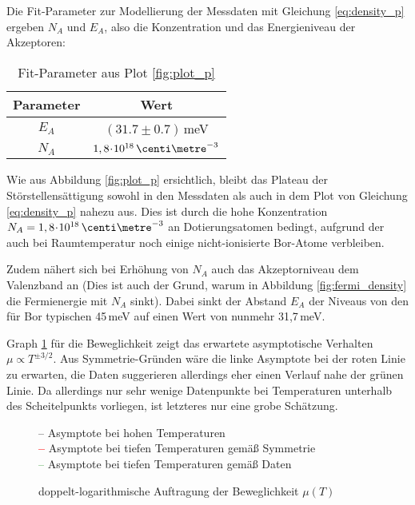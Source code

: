 Die Fit-Parameter zur Modellierung der Messdaten mit Gleichung \eqref{eq:density_p} ergeben $N_A$ und $E_A$, also die Konzentration und das Energieniveau der Akzeptoren:
\begin{table}[h!]
\centering
\caption{Fit-Parameter aus Plot \ref{fig:plot_p}} \label{tab:p_fit}
\begin{tabular}{cc}
	\toprule
	Parameter		& Wert 							\\
	\midrule
	$E_A$		& $(31.7 \pm 0.7)\,$meV				\\
	$N_A$		& $1,8 \cdt 10^{18}\,\centi\metre^{-3}$	\\
	\bottomrule
\end{tabular}
\end{table}

Wie aus Abbildung \ref{fig:plot_p} ersichtlich, bleibt das Plateau der Störstellensättigung sowohl in den Messdaten als auch in dem Plot von Gleichung \eqref{eq:density_p} nahezu aus. Dies ist durch die hohe Konzentration $N_A = 1,8\cdt 10^{18}\,\centi\metre^{-3}$ an Dotierungsatomen bedingt, aufgrund der auch bei Raumtemperatur noch einige nicht-ionisierte Bor-Atome verbleiben.

Zudem nähert sich bei Erhöhung von $N_A$ auch das Akzeptorniveau dem Valenzband an (Dies ist auch der Grund, warum in Abbildung \ref{fig:fermi_density} die Fermienergie mit $N_A$ sinkt). Dabei sinkt der Abstand $E_A$ der Niveaus von den für Bor typischen 45\,meV auf einen Wert von nunmehr 31,7\,meV.

Graph \ref{fig:plot_mu} für die Beweglichkeit zeigt das erwartete asymptotische Verhalten $\mu \propto T^{\pm 3/2}$. Aus Symmetrie-Gründen wäre die linke Asymptote bei der roten Linie zu erwarten, die Daten suggerieren allerdings eher einen Verlauf nahe der grünen Linie. Da allerdings nur sehr wenige Datenpunkte bei Temperaturen unterhalb des Scheitelpunkts vorliegen, ist letzteres nur eine grobe Schätzung.
\begin{figure}[p]
\centering
\begin{sideways}

\end{sideways}
\caption{doppelt-logarithmische Auftragung der Beweglichkeit $\mu(T)$}
\label{fig:plot_mu}
\textcolor{black}{--} Asymptote bei hohen Temperaturen\\
\textbf{\textcolor{red}{--}} Asymptote bei tiefen Temperaturen gemäß Symmetrie\\
\textcolor{green}{--} Asymptote bei tiefen Temperaturen gemäß Daten
\end{figure}


